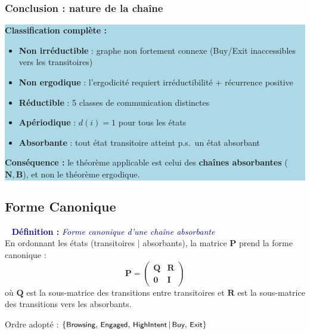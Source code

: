 \documentclass[11pt,a4paper]{article}
\newenvironment{defbox}[1]{%
  \vspace{3pt}\begin{framed}
  \noindent{\color{NavyBlue}\rule{0.3cm}{3pt}}~%
  \textcolor{DarkBlue}{\textbf{Définition :} \textit{#1}}\\[3pt]}
  {\end{framed}\vspace{3pt}}
\newcommand{\mat}[1]{\mathbf{#1}}
\newcommand{\st}[1]{\textsf{\small#1}}
\begin{document}
\subsubsection{Conclusion : nature de la chaîne}

\colorbox{LightBlue}{\parbox{\dimexpr\linewidth-2\fboxsep\relax}{%
\textbf{\color{DarkBlue}Classification complète :}
\begin{itemize}[leftmargin=1.5em,itemsep=2pt,topsep=4pt]
  \item[\textcolor{DarkRed}{$\times$}] \textbf{Non irréductible} :
        graphe non fortement connexe (Buy/Exit inaccessibles vers les transitoires)
  \item[\textcolor{DarkRed}{$\times$}] \textbf{Non ergodique} :
        l'ergodicité requiert irréductibilité + récurrence positive
  \item[\textcolor{DarkGreen}{\checkmark}] \textbf{Réductible} :
        5 classes de communication distinctes
  \item[\textcolor{DarkGreen}{\checkmark}] \textbf{Apériodique} :
        $d(i) = 1$ pour tous les états
  \item[\textcolor{DarkGreen}{\checkmark}] \textbf{Absorbante} :
        tout état transitoire atteint p.s.\ un état absorbant
\end{itemize}
\textbf{Conséquence :} le théorème applicable est celui des
\textbf{chaînes absorbantes} ($\mat{N},\mat{B}$),
et non le théorème ergodique.
}}

\subsection{Forme Canonique}

\begin{defbox}{Forme canonique d'une chaîne absorbante}
En ordonnant les états (transitoires $|$ absorbants), la matrice
$\mat{P}$ prend la forme canonique :
\[
  \mat{P} =
  \left(\begin{array}{c|c}
    \mat{Q} & \mat{R} \\ \hline
    \mat{0} & \mat{I}
  \end{array}\right)
\]
où $\mat{Q}$ est la sous-matrice des transitions entre transitoires
et $\mat{R}$ est la sous-matrice des transitions vers les absorbants.
\end{defbox}

Ordre adopté : $\{\st{Browsing},\,\st{Engaged},\,\st{HighIntent}\,|
\,\st{Buy},\,\st{Exit}\}$
\end{document}
